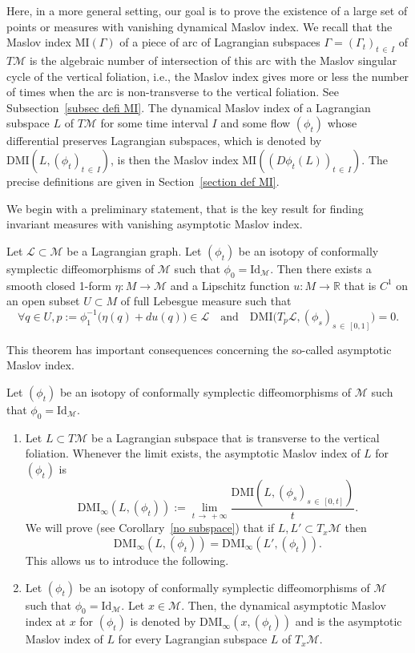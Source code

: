 \documentclass[AHL, Unicode, longabstracts, published]{cedram}
\newcommand*\M{\mathcal{M}}
\newcommand*\cl{\mathcal{L}}
\newcommand{\rId}{\mathrm{Id}}
\newcommand{\DMI}{\mathrm{DMI}}
\newcommand{\MI}{\mathrm{MI}}
\newcommand*\R{\mathbb{R}}
\let\oldforall\forall
\renewcommand*{\forall}{\mathrel{\oldforall}}
\begin{document}
Here, in a more general setting, our goal is to prove the existence of a large set of points or measures with vanishing dynamical Maslov index. We recall that the Maslov index $\MI(\Gamma)$ of a piece of arc of Lagrangian subspaces $\Gamma=(\Gamma_t)_{t\,\in\,I}$ of $T\M$ is the algebraic number of intersection of this arc with the Maslov singular cycle of the vertical foliation, i.e., the Maslov index gives more or less the number of times when the arc is non-transverse to the vertical foliation. See Subsection~\ref{subsec defi MI}. The dynamical Maslov index of a Lagrangian subspace $L$ of $T\M$ for some time interval $I$ and some flow $(\phi_t)$ whose differential preserves Lagrangian subspaces, which is denoted by $\DMI(L, (\phi_t)_{t\,\in\,I})$, is then the Maslov index $\MI((D\phi_t(L))_{t\,\in\,I})$. The precise definitions are given in Section~\ref{section def MI}.


We begin with a preliminary statement, that is the key result for finding invariant measures with vanishing asymptotic Maslov index.

\begin{theo}\label{Tppal}
Let $\cl\subset \M$ be a Lagrangian graph. Let $(\phi_t)$ be an isotopy of conformally symplectic diffeomorphisms of $\M$ such that $\phi_0=\rId_{\M}$. Then there exists a smooth closed 1-form $\eta :M\rightarrow \M$ and a Lipschitz function $u:M\rightarrow \R$ that is $C^1$ on an open subset $U\subset M$ of full Lebesgue measure such that
\[
\forall q\in U, p:=\phi^{-1}_1\big(\eta(q)+du(q)\big)\in \cl\quad\text{and}\quad \DMI\Big(T_{p}\cl,(\phi_s)_{s\,\in\,[0,1]}
\Big)=0.
\]
\end{theo}



This theorem has important consequences concerning the so-called asymptotic Maslov index.

\begin{defi}
Let
$(\phi_t) $ be an isotopy of conformally symplectic diffeomorphisms of $\M$ such that $\phi_0=\rId_\M$.
\begin{enumerate}
\item\label{defi1.2.1} Let $L\subset T\M$ be a Lagrangian subspace that is transverse to the vertical foliation. Whenever the limit exists, the {asymptotic Maslov index} of $L$ for $(\phi_t)$ is
\[
\DMI_{\infty}(L, (\phi_t)):=\lim_{t\,\to\,+\infty}\dfrac{\DMI(L,(\phi_s)_{s\,\in\,[0,t]})}{t}.
\]
We will prove (see Corollary~\ref{no subspace}) that if $L, L'\subset T_x\M$ then
\[
\DMI_{\infty}(L, (\phi_t)
)=\DMI_{\infty}(L', (\phi_t)
).
\]
This allows us to introduce the following.

\item\label{defi1.2.2} Let $(\phi_t) $ be an isotopy of conformally symplectic diffeomorphisms of $\M$ such that $\phi_0=\rId_\M$. Let $x\in \M$. Then, the dynamical asymptotic Maslov index at $x$ for $(\phi_t) $ is denoted by $\DMI_\infty(x, (\phi_t))$ and is the asymptotic Maslov index of $L$ for every Lagrangian subspace $L$ of $T_x\M$.
\end{enumerate}
\end{defi}
\end{document}
